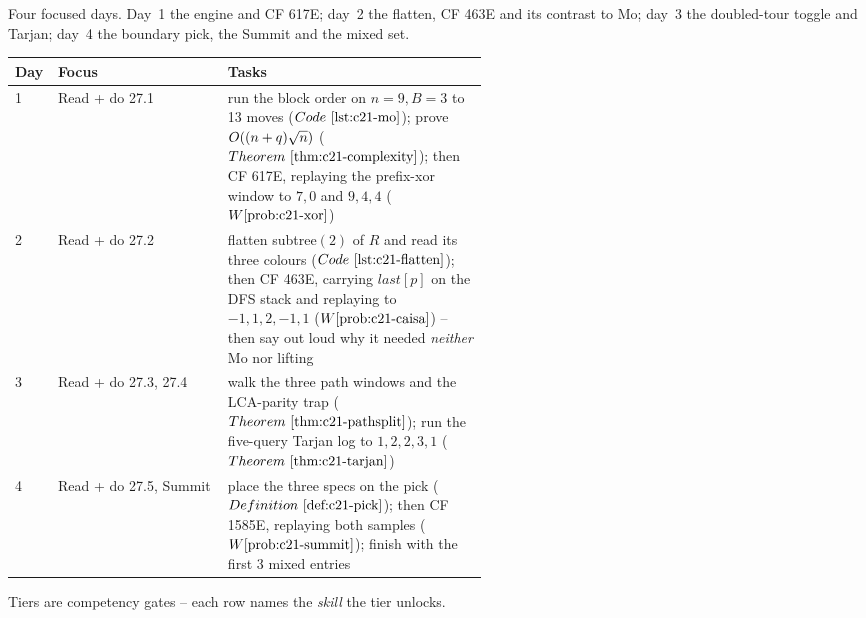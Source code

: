 
Four focused days. Day~1 the engine and CF 617E; day~2 the flatten, CF 463E and its
contrast to Mo; day~3 the doubled-tour toggle and Tarjan; day~4 the boundary pick, the
Summit and the mixed set.

\begin{center}
\small
\renewcommand{\arraystretch}{1.25}
\setlength{\tabcolsep}{3pt}
\begin{tabular}{@{}llp{0.55\linewidth}@{}}
\toprule
\textbf{Day} & \textbf{Focus} & \textbf{Tasks} \\
\midrule
1 & Read + do 27.1 & run the block order on \(n{=}9,B{=}3\) to 13 moves (\(\coderef{c21-mo}\)); prove \(O((n+q)\sqrt n)\) (\(\thmref{c21-complexity}\)); then CF 617E, replaying the prefix-xor window to \(7,0\) and \(9,4,4\) (\(\probref{c21-xor}\)) \\
2 & Read + do 27.2 & flatten subtree\((2)\) of \(R\) and read its three colours (\(\coderef{c21-flatten}\)); then CF 463E, carrying \(\mathit{last}[p]\) on the DFS stack and replaying to \(-1,1,2,-1,1\) (\(\probref{c21-caisa}\)) -- then say out loud why it needed \emph{neither} Mo nor lifting \\
3 & Read + do 27.3, 27.4 & walk the three path windows and the LCA-parity trap (\(\thmref{c21-pathsplit}\)); run the five-query Tarjan log to \(1,2,2,3,1\) (\(\thmref{c21-tarjan}\)) \\
4 & Read + do 27.5, Summit & place the three specs on the pick (\(\defref{c21-pick}\)); then CF 1585E, replaying both samples (\(\probref{c21-summit}\)); finish with the first 3 mixed entries \\
\bottomrule
\end{tabular}
\end{center}


Tiers are competency gates -- each row names the \emph{skill} the tier unlocks.

